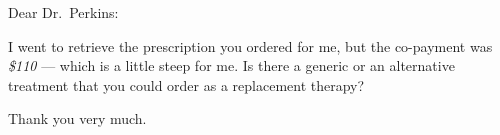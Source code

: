 \documentclass[12pt]{facsimile}
\author{\faxauthor}
\begin{document}
\makefaxtitle
\opening{Dear Dr.\ Perkins:}
I went to retrieve the prescription you ordered for me, but the co-payment was \textit{\$110} --- which is a little steep for me. Is there a generic or an alternative treatment that you could order as a replacement therapy?

Thank you very much.
\closing{\ }
\end{document}
